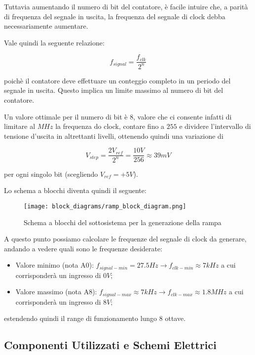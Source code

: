 Tuttavia aumentando il numero di bit del contatore, è facile intuire che, a parità di
frequenza del segnale in uscita, la frequenza del segnale di clock debba necessariamente
aumentare.

Vale quindi la seguente relazione:

$$f_{signal}=\frac{f_{clk}}{2^n}$$

poichè il contatore deve effettuare un conteggio completo in un periodo del segnale in uscita.
Questo implica un limite massimo al numero di bit del contatore.

Un valore ottimale per il numero di bit è $8$, valore che ci consente infatti di limitare
al $MHz$ la frequenza do clock, contare fino a $255$ e dividere l'intervallo di tensione
d'uscita in altrettanti livelli, ottenendo quindi una variazione di

$$V_{step}=\frac{2V_{ref}}{2^n}=\frac{10V}{256}\approx39mV$$

per ogni singolo bit (scegliendo $V_{ref}=+5V$).

Lo schema a blocchi diventa quindi il seguente:
\medskip

\begin{figure}[ht]
    \centering
    \texttt{[image: block\_diagrams/ramp\_block\_diagram.png]}
    \caption{Schema a blocchi del sottosistema per la generazione della rampa}
    \label{ramp_block_diagram}
\end{figure}

A questo punto possiamo calcolare le frequenze del segnale di clock da generare,
andando a vedere quali sono le frequenze desiderate:

\begin{itemize}
    \item Valore minimo (nota A0): $f_{signal-min}=27.5Hz\rightarrow f_{clk-min}\approx7kHz$
          a cui corrisponderà un ingresso di $0V$;
    \item Valore massimo (nota A8): $f_{signal-max}\approx7kHz\rightarrow f_{clk-max}\approx1.8MHz$
          a cui corrisponderà un ingresso di $8V$;
\end{itemize}

estendendo quindi il range di funzionamento lungo 8 ottave.


\subsection*{Componenti Utilizzati e Schemi Elettrici}

